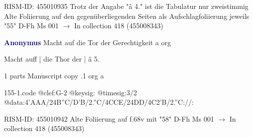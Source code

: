 \documentclass[twocolumn]{book}
\begin{document}
\newline RISM-ID: 455010935
\newline Trotz der Angabe "â 4." ist die Tabulatur nur zweistimmig
\newline Alte Foliierung auf den gegenüberliegenden Seiten als Aufschlagfoliierung jeweils "55"
\newline D-Fh  Ms 001
\newline $\rightarrow$ In collection 418 (455008343)

\newline \par \vspace{7pt} \textcolor{darkblue}{\textbf{Anonymus  }}
\newline Macht auf die Tor der Gerechtigkeit  a  
\newline org
\newline \begin{itshape}[f.68v, at left:] Macht auff | die Thor der | â 5.\end{itshape} 
\newline \textcolor{darkblue}{}  1 parts  
\newline Manuscript copy
.1  org  a  
\begin{filecontents*}{155-1.code}
@clef:G-2
@keysig:
@timesig:3/2
@data:4'AAA/24B''C/D'B/2.''C/4CCE/24DD/4C2'B/2.''C://:
\end{filecontents*}
\newline
%

\newline RISM-ID: 455010942
\newline Alte Foliierung auf f.68v mit "58"
\newline D-Fh  Ms 001
\newline $\rightarrow$ In collection 418 (455008343)
\end{document}
